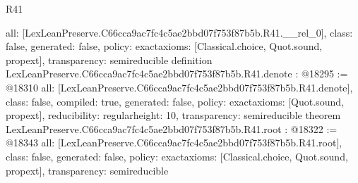 \begin{lexlean}{R41}
\begin{coremodule}
{  all: [LexLeanPreserve.C66cca9ac7fc4c5ae2bbd07f753f87b5b.R41.__rel_0],
  class: false,
  generated: false,
  policy: exact{axioms: [Classical.choice, Quot.sound, propext]},
  transparency: semireducible
}
definition LexLeanPreserve.C66cca9ac7fc4c5ae2bbd07f753f87b5b.R41.denote : @18295 := @18310 {
  all: [LexLeanPreserve.C66cca9ac7fc4c5ae2bbd07f753f87b5b.R41.denote],
  class: false,
  compiled: true,
  generated: false,
  policy: exact{axioms: [Quot.sound, propext]},
  reducibility: regular{height: 10},
  transparency: semireducible
}
theorem LexLeanPreserve.C66cca9ac7fc4c5ae2bbd07f753f87b5b.R41.root : @18322 := @18343 {
  all: [LexLeanPreserve.C66cca9ac7fc4c5ae2bbd07f753f87b5b.R41.root],
  class: false,
  generated: false,
  policy: exact{axioms: [Classical.choice, Quot.sound, propext]},
  transparency: semireducible
}


\end{coremodule}
\end{lexlean}

